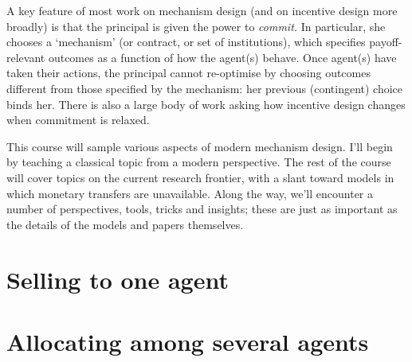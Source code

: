 \documentclass[11pt,letterpaper,reqno,oneside]{book}
\begin{document}
A key feature of most work on mechanism design (and on incentive design more broadly) is that the principal is given the power to \emph{commit.}
In particular, she chooses a `mechanism' (or contract, or set of institutions), which specifies payoff-relevant outcomes as a function of how the agent(s) behave.
Once agent(s) have taken their actions, the principal cannot re-optimise by choosing outcomes different from those specified by the mechanism: her previous (contingent) choice binds her.
There is also a large body of work asking how incentive design changes when commitment is relaxed.

This course will sample various aspects of modern mechanism design.
I'll begin by teaching a classical topic from a modern perspective.
The rest of the course will cover topics on the current research frontier, with a slant toward models in which monetary transfers are unavailable.
Along the way, we'll encounter a number of perspectives, tools, tricks and insights; these are just as important as the details of the models and papers themselves.



\chapter{Selling to one agent}
\label{ch1}






\chapter{Allocating among several agents}
\label{ch2}



\end{document}
